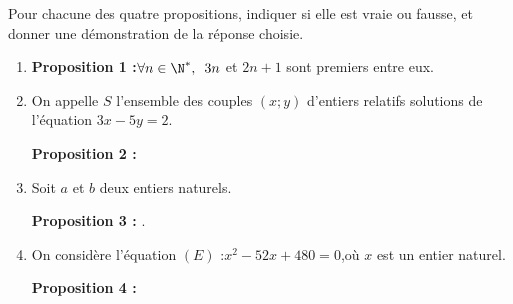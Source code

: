 \documentclass{cornouaille}
\begin{document}
\begin{exercice}

Pour chacune des quatre propositions, indiquer si elle est vraie ou fausse, et donner une démonstration de la réponse choisie.
\begin{enumerate}
\item \textbf{Proposition 1 :}\enskip $\forall n\in\N^*,\enskip 3n$ et $2n+1$ sont premiers entre eux.
\item On appelle $S$ l'ensemble des couples $(x ; y)$ d'entiers relatifs solutions de l'équation $3x -5y = 2$.

\textbf{Proposition 2 : }  \fg 
\item Soit $a$ et $b$ deux entiers naturels.

\textbf{Proposition 3 : }  \fg .
\item On considère l'équation $(E)$ :\enskip $x^2 -52x +480= 0$,\enskip où $x$ est un entier naturel.

\textbf{Proposition 4 : }  \fg 
\end{enumerate}
\end{exercice}



\end{document}
